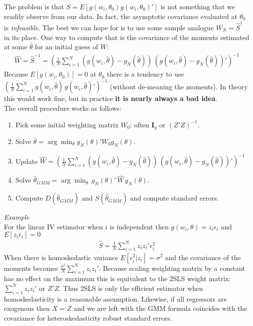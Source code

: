 \documentclass[a4paper]{article}
\begin{document}
The problem is that $S = E[g(w_i,\theta_0) g(w_i,\theta_0)']$ is not something that we readily observe from our data. In fact, the asymptotic covariance evaluated at $\theta_0$ is \textit{infeasible}. The best we can hope for is to use some sample analogue $W_N=\hat{S}^{1}$ in its place. One way to compute that is the covariance of the moments estimated at some $\hat{\theta}$ for an initial guess of $W$:
\begin{eqnarray*}
\hat{W} = \hat{S}^{-1} = \left(\frac{1}{N} \sum_{i=1}^N (g(w_i,\hat{\theta}) - g_N(\hat{\theta}))  \, (g(w_i,\hat{\theta}) - g_N(\hat{\theta}))'\right)^{-1}
\end{eqnarray*}
Because $E[g(w_i,\theta_0)]=0$ at $\theta_0$ there is a tendency to use $\left(\frac{1}{N} \sum_{i=1}^N g(w_i,\hat{\theta}) \, g(w_i,\hat{\theta} )'\right)^{-1}$ (without de-meaning the moments). In theory this would work fine, but in practice \textbf{it is nearly always a bad idea}.\\

\noindent The overall procedure works as follows:
\begin{enumerate}
\item Pick some initial weighting matrix $W_0$: often $\symbf{I}_q$ or $(Z'Z)^{-1}$.
\item Solve $\hat{\theta} = \arg \min_{\theta} g_N(\theta)' W_0  g_N(\theta)$.
\item Update $\hat{W} = \left(\frac{1}{N} \sum_{i=1}^N (g(w_i,\hat{\theta}) - g_N(\hat{\theta}))  \, (g(w_i,\hat{\theta}) - g_N(\hat{\theta}))'\right)^{-1}$
\item Solve $\hat{\theta}_{GMM} = \arg \min_{\theta}\, g_N(\theta)' \, \hat{W} \, g_N(\theta)$.
\item Compute $D(\hat{\theta}_{GMM})$ and $S(\hat{\theta}_{GMM})$ and compute standard errors.
\end{enumerate}

\noindent \textit{Example}\\

For the linear IV estimator when $i$ is independent then $g(w_i,\theta) = z_i \epsilon_i$ and $E[z_i \epsilon_i]=0$
\begin{eqnarray*}
\hat{S}=\frac{1}{N} \sum_{i=1}^N z_i z_i' \epsilon_i^2
\end{eqnarray*}
When there is homoskedastic variance $E[\epsilon_i^2 | z_i] = \sigma^2$ and the covariance of the moments becomes $\frac{\sigma^2}{N} \sum_{i=1}^N z_i z_i'$. Because scaling weighting matrix by a constant has no effect on the maximum this is equivalent to the 2SLS weight matrix: $\sum_{i=1}^N z_i z_i'$ or $Z'Z$. Thus 2SLS is only the efficient estimator when homoskedasticity is a reasonable assumption. Likewise, if all regressors are exogenous then $X=Z$ and we are left with the GMM formula coincides with the covariance for heteroskedasticity robust standard errors.
\end{document}
